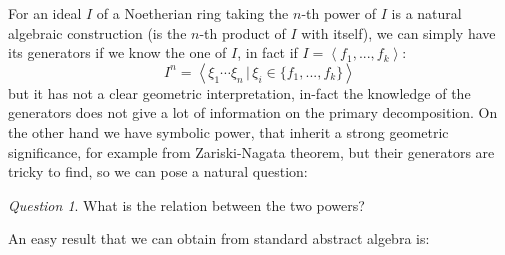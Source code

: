 \documentclass[notitlepage, a4]{book}
\theoremstyle{plain}
\theoremstyle{remark}
\newtheorem{que}[rem]{Question}
\theoremstyle{definition}
\newcounter{que}
\begin{document}
For an ideal $ I $ of a Noetherian ring taking the $ n $-th power of $ I $ is a natural algebraic construction (is the $ n $-th product of $ I $ with itself), we can simply have its generators if we know the one of $ I $, in fact if $ I = \left\langle f_1 , ... ,f_k \right\rangle $:
\[ I^n = \left\langle \xi_1 \cdots \xi_n \,|\, \xi_i \in \{ f_1 , ... ,f_k \} \right\rangle \]
but it has not a clear geometric interpretation, in-fact the knowledge of the generators does not give a lot of information on the primary decomposition. On the other hand we have symbolic power, that inherit a strong geometric significance, for example from Zariski-Nagata theorem, but their generators are tricky to find, so we can pose a natural question:

\begin{que}
What is the relation between the two powers?
\end{que}

An easy result that we can obtain from standard abstract algebra is:
\end{document}
